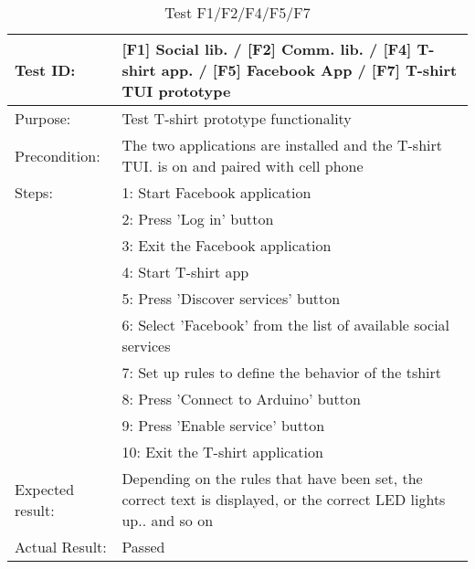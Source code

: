 \begin{table}[h!]
\begin{tabular}{|l|p{10cm}|}
\hline Test ID: &		[F1] Social lib. / [F2] Comm. lib. / [F4] T-shirt app. /
						[F5] Facebook App / [F7] T-shirt TUI prototype \\
\hline Purpose: &		Test T-shirt prototype functionality \\
\hline Precondition: &	The two applications are installed and the T-shirt TUI.
						is on and paired with cell phone \\
\hline
Steps:
  & 1: Start Facebook application \\
  & 2: Press 'Log in' button \\
  & 3: Exit the Facebook application \\
  & 4: Start T-shirt app \\
  & 5: Press 'Discover services' button \\
  & 6: Select 'Facebook' from the list of available social services \\
  & 7: Set up rules to define the behavior of the tshirt \\
  & 8: Press 'Connect to Arduino' button \\
  & 9: Press 'Enable service' button \\
  &10: Exit the T-shirt application \\
\hline
Expected result:
   & Depending on the rules that have been set, the correct text is displayed,
   or the correct LED lights up.. and so on \\
\hline
Actual Result:
  &  Passed \\
\hline
\end{tabular}
\caption{Test F1/F2/F4/F5/F7}
\label{tbl:f1f2f4f5f7test}
\end{table}

